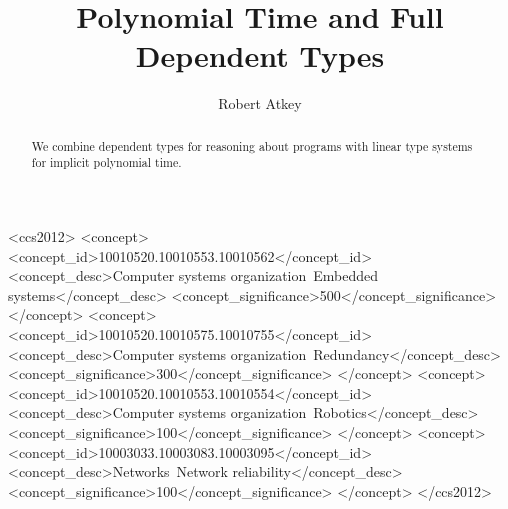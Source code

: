 \documentclass[acmsmall,review]{acmart}
\begin{document}
\title{Polynomial Time and Full Dependent Types}

\author{Robert Atkey}



\begin{abstract}
  We combine dependent types for reasoning about programs with linear
  type systems for implicit polynomial time.
\end{abstract}

\begin{CCSXML}
<ccs2012>
 <concept>
  <concept_id>10010520.10010553.10010562</concept_id>
  <concept_desc>Computer systems organization~Embedded systems</concept_desc>
  <concept_significance>500</concept_significance>
 </concept>
 <concept>
  <concept_id>10010520.10010575.10010755</concept_id>
  <concept_desc>Computer systems organization~Redundancy</concept_desc>
  <concept_significance>300</concept_significance>
 </concept>
 <concept>
  <concept_id>10010520.10010553.10010554</concept_id>
  <concept_desc>Computer systems organization~Robotics</concept_desc>
  <concept_significance>100</concept_significance>
 </concept>
 <concept>
  <concept_id>10003033.10003083.10003095</concept_id>
  <concept_desc>Networks~Network reliability</concept_desc>
  <concept_significance>100</concept_significance>
 </concept>
</ccs2012>
\end{CCSXML}
\end{document}
